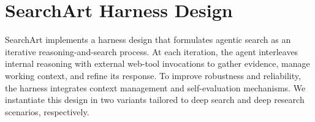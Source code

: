 \documentclass{huawei}
\begin{document}
\section{SearchArt Harness Design}

SearchArt implements a harness design that formulates agentic search as an iterative reasoning-and-search process. At each iteration, the agent interleaves internal reasoning with external web-tool invocations to gather evidence, manage working context, and refine its response. To improve robustness and reliability, the harness integrates context management and self-evaluation mechanisms. We instantiate this design in two variants tailored to deep search and deep research scenarios, respectively.


\end{document}

